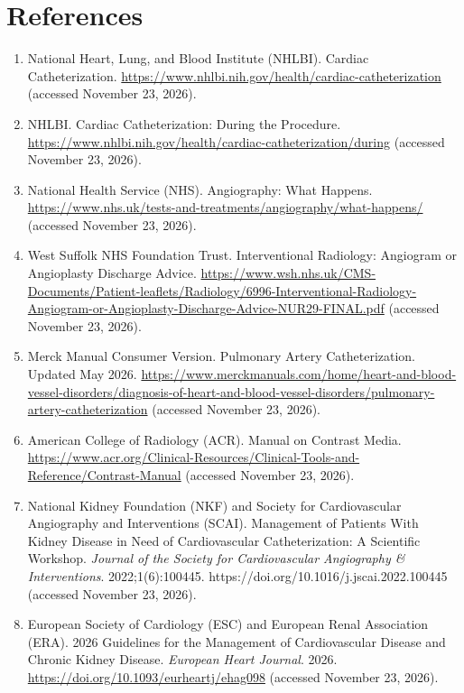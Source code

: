 \section*{References}
\begin{enumerate}
  \item National Heart, Lung, and Blood Institute (NHLBI). Cardiac Catheterization. \url{https://www.nhlbi.nih.gov/health/cardiac-catheterization} (accessed November 23, 2026).
  \item NHLBI. Cardiac Catheterization: During the Procedure. \url{https://www.nhlbi.nih.gov/health/cardiac-catheterization/during} (accessed November 23, 2026).
  \item National Health Service (NHS). Angiography: What Happens. \url{https://www.nhs.uk/tests-and-treatments/angiography/what-happens/} (accessed November 23, 2026).
  \item West Suffolk NHS Foundation Trust. Interventional Radiology: Angiogram or Angioplasty Discharge Advice. \url{https://www.wsh.nhs.uk/CMS-Documents/Patient-leaflets/Radiology/6996-Interventional-Radiology-Angiogram-or-Angioplasty-Discharge-Advice-NUR29-FINAL.pdf} (accessed November 23, 2026).
  \item Merck Manual Consumer Version. Pulmonary Artery Catheterization. Updated May 2026. \url{https://www.merckmanuals.com/home/heart-and-blood-vessel-disorders/diagnosis-of-heart-and-blood-vessel-disorders/pulmonary-artery-catheterization} (accessed November 23, 2026).
  \item American College of Radiology (ACR). Manual on Contrast Media. \url{https://www.acr.org/Clinical-Resources/Clinical-Tools-and-Reference/Contrast-Manual} (accessed November 23, 2026).
  \item National Kidney Foundation (NKF) and Society for Cardiovascular Angiography and Interventions (SCAI). Management of Patients With Kidney Disease in Need of Cardiovascular Catheterization: A Scientific Workshop. \textit{Journal of the Society for Cardiovascular Angiography \& Interventions}. 2022;1(6):100445. https://doi.org/10.1016/j.jscai.2022.100445 (accessed November 23, 2026).
  \item European Society of Cardiology (ESC) and European Renal Association (ERA). 2026 Guidelines for the Management of Cardiovascular Disease and Chronic Kidney Disease. \textit{European Heart Journal}. 2026. \url{https://doi.org/10.1093/eurheartj/ehag098} (accessed November 23, 2026).
\end{enumerate}

\clearpage
